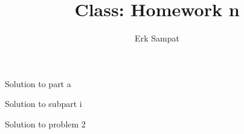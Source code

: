 \title{{\selectfont Class: } Homework n}
\author{Erk Sampat}



\maketitle
\prob
\begin{ppart}
	Solution to part a
\end{ppart}
\begin{ppart}
	\begin{spart}
		Solution to subpart i
	\end{spart}
\end{ppart}
\prob
Solution to problem 2

